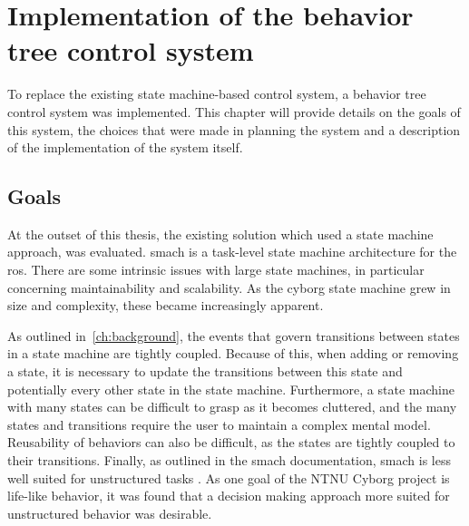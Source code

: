 \documentclass[\rootfolder/main.tex]{subfiles}
\begin{document}
\chapter{Implementation of the behavior tree control system} %
\label{ch:implementation-control} %

To replace the existing state machine-based control system, a behavior tree control system was implemented.
This chapter will provide details on the goals of this system, the choices that were made in planning the system and a description of the implementation of the system itself.


\section{Goals}

At the outset of this thesis, the existing solution which used a state machine approach, was evaluated.
\acrshort{smach} is a task-level state machine architecture for the \acrfull{ros}.
There are some intrinsic issues with large state machines, in particular concerning maintainability and scalability.
As the cyborg state machine grew in size and complexity, these became increasingly apparent.

As outlined in~\cref{ch:background}, the events that govern transitions between states in a state machine are tightly coupled.
Because of this, when adding or removing a state, it is necessary to update the transitions between this state and potentially every other state in the state machine.
Furthermore, a state machine with many states can be difficult to grasp as it becomes cluttered, and the many states and transitions require the user to maintain a complex mental model.
Reusability of behaviors can also be difficult, as the states are tightly coupled to their transitions.
Finally, as outlined in the \acrshort{smach} documentation, \acrshort{smach} is less well suited for unstructured tasks \cite{Bohren}.
As one goal of the NTNU Cyborg project is life-like behavior, it was found that a decision making approach more suited for unstructured behavior was desirable.

\end{document}
